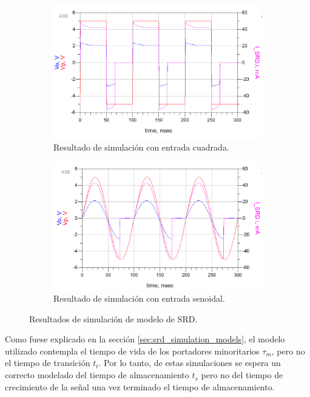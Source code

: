 \begin{figure}
    \centering
    \begin{subfigure}[b]{0.45\textwidth}
        \includegraphics[width=\textwidth]{images/srd_result_square.png}
        \caption{Resultado de simulación con entrada cuadrada.}
        \label{fig:srd_result_square}
    \end{subfigure}
    \hfill
    \begin{subfigure}[b]{0.45\textwidth}
        \includegraphics[width=\textwidth]{images/srd_result_sine.png}
        \caption{Resultado de simulación con entrada senoidal.}
        \label{fig:srd_result_sine}
    \end{subfigure}
    \caption{Resultados de simulación de modelo de SRD.}
    \label{fig:srd_results}
\end{figure}

Como fuese explicado en la sección \ref{sec:srd_simulation_models}, el modelo
utilizado contempla el tiempo de vida de los portadores minoritarios $\tau_m$,
pero no el tiempo de transición $t_t$. Por lo tanto, de estas simulaciones se
espera un correcto modelado del tiempo de almacenamiento $t_s$ pero no del
tiempo de crecimiento de la señal una vez terminado el tiempo de almacenamiento.

